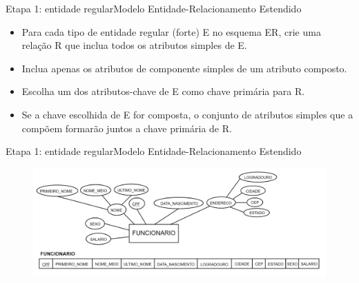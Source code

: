 \documentclass[t]{beamer}
\begin{document}
\begin{ftst}{Etapa 1: entidade regular}{Modelo Entidade-Relacionamento Estendido}
\begin{itemize}
    \item Para cada tipo de entidade regular (forte) E no esquema ER, crie uma relação R que inclua todos os atributos simples de E.
    \item Inclua apenas os atributos de componente simples de um atributo composto.
    \item Escolha um dos atributos-chave de E como chave primária para R.
    \item Se a chave escolhida de E for composta, o conjunto de atributos simples que a compõem formarão juntos a chave primária de R.
    
\end{itemize}
\end{ftst}


\begin{ftst}{Etapa 1: entidade regular}{Modelo Entidade-Relacionamento Estendido}
\vone
\begin{figure}
    \centering
    \includegraphics[scale=0.15]{Figuras/03_03.png}
\end{figure}
\end{ftst}

\end{document}
